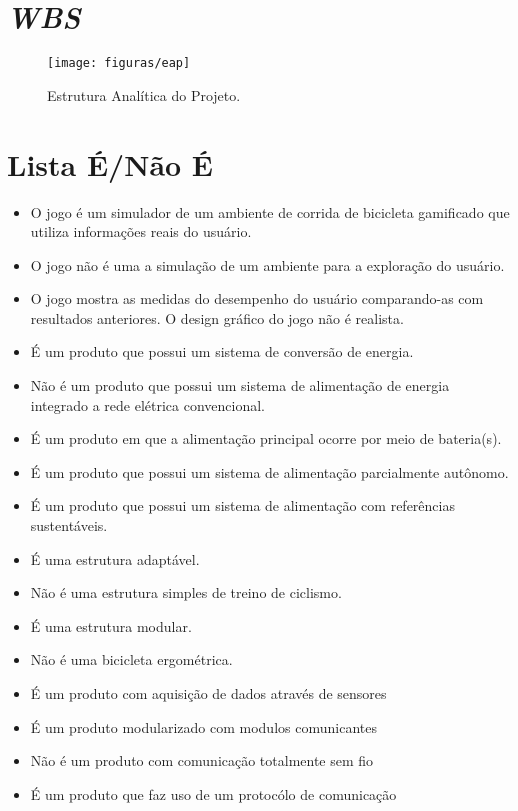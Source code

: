 \section{\textit{WBS}}

 \begin{figure}[!ht]
	\centering
		\texttt{[image: figuras/eap]}
	\caption{Estrutura Analítica do Projeto.}
\end{figure} 

\section{Lista É/Não É}

\begin{itemize}
\item O jogo é um simulador de um ambiente de corrida de bicicleta gamificado que utiliza informações reais do usuário.
\item O jogo não é uma a simulação de um ambiente para a exploração do usuário.
\item O jogo mostra as medidas do desempenho do usuário comparando-as com resultados anteriores. O design gráfico do jogo não é realista.            

\item É um produto que possui um sistema de conversão de energia.
\item Não é um produto que possui um sistema de alimentação de energia integrado a rede elétrica convencional.
\item É um produto em que a alimentação principal ocorre por meio de bateria(s).
\item É um produto que possui um sistema de alimentação parcialmente autônomo.
\item É um produto que possui um sistema de alimentação com referências sustentáveis.

\item É uma estrutura adaptável.
\item Não é uma estrutura simples de treino de ciclismo.
\item É uma estrutura modular.
\item Não é uma bicicleta ergométrica.

\item É um produto com aquisição de dados através de sensores
\item É um produto modularizado com modulos comunicantes
\item Não é um produto com comunicação totalmente sem fio
\item É um produto que faz uso de um protocólo de comunicação


\end{itemize}


